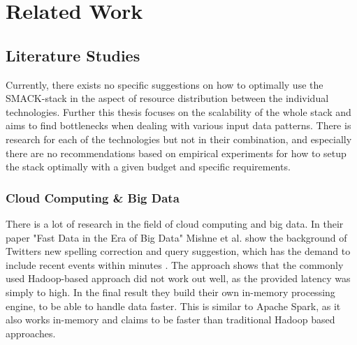 \chapter{Related Work}
\label{ch:related}

\section{Literature Studies}
Currently, there exists no specific suggestions on how to optimally use the SMACK-stack in the aspect of resource distribution between the individual technologies.
Further this thesis focuses on the scalability of the whole stack and aims to find bottlenecks when dealing with various input data patterns.
There is research for each of the technologies but not in their combination, and especially there are no recommendations based on empirical experiments for how to setup the stack optimally with a given budget and specific requirements.

\subsection{Cloud Computing \& Big Data}
There is a lot of research in the field of cloud computing and big data.
In their paper "Fast Data in the Era of Big Data" Mishne et al. show the background of Twitters new spelling correction and query suggestion, which has the demand to include recent events within minutes \cite{mishne2013fast}.
The approach shows that the commonly used Hadoop-based approach did not work out well, as the provided latency was simply to high.
In the final result they build their own in-memory processing engine, to be able to handle data faster.
This is similar to Apache Spark, as it also works in-memory and claims to be faster than traditional Hadoop based approaches.\\

